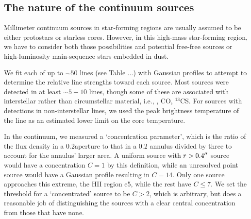 \documentclass{aa}
\begin{document}


\subsection{The nature of the continuum sources}
\label{sec:contsourcenature}
Millimeter continuum sources in star-forming regions are usually assumed to be
either protostars or starless cores.  However, in this high-mass star-forming
region, we have to consider both those possibilities and potential free-free
sources or high-luminosity main-sequence stars embedded in dust.

We fit each of up to $\sim50$ lines (see Table ...) with Gaussian profiles to
attempt to determine the relative line strengths toward each source.  Most
sources were detected in at least $\sim5-10$ lines, though some of these are
associated with interstellar rather than circumstellar material, i.e.,
\formaldehyde, CO, $^{13}$CS.  For sources with detections in non-interstellar
lines, we used the peak brightness temperature of the line as an estimated lower
limit on the core temperature.

In the continuum, we measured a `concentration parameter', which is the ratio
of the flux density in a 0.2\arcsec aperture to that in a 0.2\arcsec
annulus divided by three to account for the annulus' larger area.  A uniform
source with $r>0.4\mbox{$^{\prime\prime}$}$ source would have a concentration $C=1$ by this
definition, while an unresolved point source would have a Gaussian profile
resulting in $C=14$.  Only one source approaches this extreme, the HII region
e5, while the rest have $C\leq7$.  We set the threshold for a `concentrated'
source to be $C>2$, which is arbitrary, but does a reasonable job of
distinguishing the sources with a clear central concentration from those that
have none.
\end{document}
